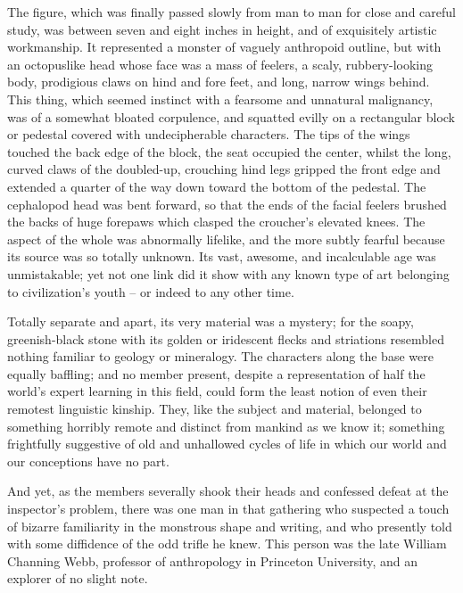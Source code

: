 The figure, which was finally passed slowly from man to man for close and careful study, was between seven and eight inches in height, and of exquisitely artistic workmanship. It represented a monster of vaguely anthropoid outline, but with an octopuslike head whose face was a mass of feelers, a scaly, rubbery-looking body, prodigious claws on hind and fore feet, and long, narrow wings behind. This thing, which seemed instinct with a fearsome and unnatural malignancy, was of a somewhat bloated corpulence, and squatted evilly on a rectangular block or pedestal covered with undecipherable characters. The tips of the wings touched the back edge of the block, the seat occupied the center, whilst the long, curved claws of the doubled-up, crouching hind legs gripped the front edge and extended a quarter of the way down toward the bottom of the pedestal. The cephalopod head was bent forward, so that the ends of the facial feelers brushed the backs of huge forepaws which clasped the croucher’s elevated knees. The aspect of the whole was abnormally lifelike, and the more subtly fearful because its source was so totally unknown. Its vast, awesome, and incalculable age was unmistakable; yet not one link did it show with any known type of art belonging to civilization’s youth⁠ – or indeed to any other time.

Totally separate and apart, its very material was a mystery; for the soapy, greenish-black stone with its golden or iridescent flecks and striations resembled nothing familiar to geology or mineralogy. The characters along the base were equally baffling; and no member present, despite a representation of half the world’s expert learning in this field, could form the least notion of even their remotest linguistic kinship. They, like the subject and material, belonged to something horribly remote and distinct from mankind as we know it; something frightfully suggestive of old and unhallowed cycles of life in which our world and our conceptions have no part.

And yet, as the members severally shook their heads and confessed defeat at the inspector’s problem, there was one man in that gathering who suspected a touch of bizarre familiarity in the monstrous shape and writing, and who presently told with some diffidence of the odd trifle he knew. This person was the late William Channing Webb, professor of anthropology in Princeton University, and an explorer of no slight note.

